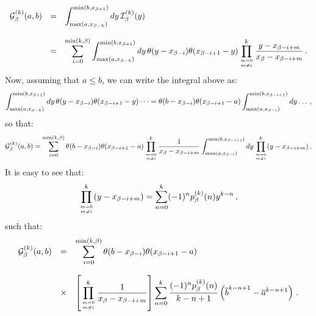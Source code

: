\documentclass[10pt,a4paper]{article}
\begin{document}
\begin{equation}
\begin{array}{rcl}
\displaystyle \mathcal{G}_\beta^{(k)}(a,b) &=& \displaystyle
                                               \int_{{\rm
                                               max}(a,x_{\beta-k})}^{{\rm
                                               min}(b,x_{\beta+1})}
                                               dy\,\mathcal{I}_\beta^{(k)}(y)\\
\\
&=&\displaystyle 
\sum_{i=0}^{{\rm min}(k,\beta)}
  \int_{{\rm max}(a,x_{\beta-k})}^{{\rm min}(b,x_{\beta+1})}dy\,\theta(y-x_{\beta-i})\theta(x_{\beta-i+1}-y)
  \prod^{k}_{m=0\atop m\ne
    i}\frac{y-x_{\beta-i+m}}{x_{\beta}-x_{\beta-i+m}}\,.
\end{array}
\end{equation}
Now, assuming that $a\leq b$, we can write the integral above as:
\begin{equation}
\int_{{\rm max}(a,x_{\beta-k})}^{{\rm min}(b,x_{\beta+1})} dy\,\theta(y-x_{\beta-i})\theta(x_{\beta-i+1}-y)\dots
=\theta(b-x_{\beta-i})\theta(x_{\beta-i+1}-a)\int_{{\rm max}(a,x_{\beta-i})}^{{\rm min}(b,x_{\beta-i+1})}dy\dots\,,
\end{equation}
so that:
\begin{equation}
\mathcal{G}_\beta^{(k)}(a,b) = \sum_{i=0}^{{\rm min}(k,\beta)}
  \theta(b-x_{\beta-i})\theta(x_{\beta-i+1}-a)\prod^{k}_{m=0\atop m\ne
    i}\frac{1}{x_{\beta}-x_{\beta-i+m}}\int_{{\rm max}(a,x_{\beta-i})}^{{\rm min}(b,x_{\beta-i+1})}dy\prod^{k}_{m=0\atop m\ne
    i}(y-x_{\beta-i+m})\,.
\end{equation}
It is easy to see that:
\begin{equation}\label{eq:expansion}
\prod^{k}_{m=0\atop m\ne
i}(y-x_{\beta-i+m})=\sum_{n=0}^k (-1)^n p_{\beta}^{(k)}(n)y^{k-n}\,,
\end{equation}
such that:
\begin{equation}\label{eq:linIntegral}
\begin{array}{rcl}
\displaystyle \mathcal{G}_\beta^{(k)}(a,b) &=&\displaystyle  \sum_{i=0}^{{\rm min}(k,\beta)}
  \theta(b-x_{\beta-i})\theta(x_{\beta-i+1}-a)\\
\\
&\times&\displaystyle \left[\prod^{k}_{m=0\atop m\ne
    i}\frac{1}{x_{\beta}-x_{\beta-i+m}}\right]\sum_{n=0}^k
         \frac{(-1)^n p_{\beta}^{(k)}(n)}{k-n+1}
         \left(\overline{b}^{k-n+1}-\overline{a}^{k-n+1}\right)\,.
\end{array}
\end{equation}
\end{document}
